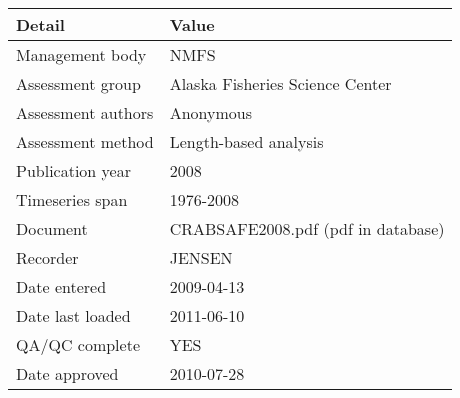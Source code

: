 \begin{table}[htb]
\centering
\begin{tabular}{lp{7cm}}
\toprule
Detail & Value \\
\midrule
Management body    & NMFS                               \\
Assessment group   & Alaska Fisheries Science Center    \\
Assessment authors & Anonymous                          \\
Assessment method  & Length-based analysis              \\
Publication year   & 2008                               \\
Timeseries span    & 1976-2008                          \\
Document           & CRABSAFE2008.pdf (pdf in database) \\
Recorder           & JENSEN                             \\
Date entered       & 2009-04-13                         \\
Date last loaded   & 2011-06-10                         \\
QA/QC complete     & YES                                \\
Date approved      & 2010-07-28                         \\
\bottomrule
\end{tabular}
\label{tab:assessdet}
\end{table}
